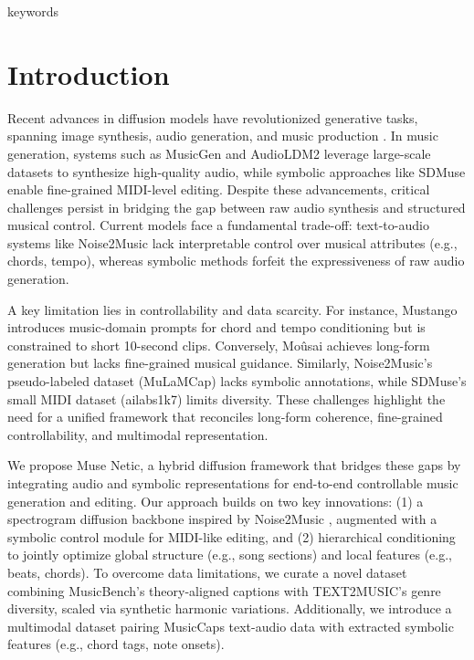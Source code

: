 \documentclass[conference]{IEEEtran}
\begin{document}
\begin{IEEEkeywords}
keywords
\end{IEEEkeywords}

\section{Introduction}
Recent advances in diffusion models have revolutionized generative tasks, spanning image synthesis, audio generation, and music production \cite{huang2024symbolicmusicgenerationnondifferentiable, mariani2024multisourcediffusionmodelssimultaneous}. In music generation, systems such as MusicGen \cite{copet2024simplecontrollablemusicgeneration} and AudioLDM2 \cite{liu2024audioldm2learningholistic} leverage large-scale datasets to synthesize high-quality audio, while symbolic approaches like SDMuse \cite{zhang2022sdmusestochasticdifferentialmusic} enable fine-grained MIDI-level editing. Despite these advancements, critical challenges persist in bridging the gap between raw audio synthesis and structured musical control. Current models face a fundamental trade-off: text-to-audio systems like Noise2Music \cite{huang2023noise2musictextconditionedmusicgeneration} lack interpretable control over musical attributes (e.g., chords, tempo), whereas symbolic methods forfeit the expressiveness of raw audio generation.  

A key limitation lies in controllability and data scarcity. For instance, Mustango \cite{melechovsky2024mustangocontrollabletexttomusicgeneration} introduces music-domain prompts for chord and tempo conditioning but is constrained to short 10-second clips. Conversely, Moûsai \cite{schneider2023mousaitexttomusicgenerationlongcontext} achieves long-form generation but lacks fine-grained musical guidance. Similarly, Noise2Music's pseudo-labeled dataset (MuLaMCap) lacks symbolic annotations, while SDMuse's small MIDI dataset (ailabs1k7) limits diversity. These challenges highlight the need for a unified framework that reconciles long-form coherence, fine-grained controllability, and multimodal representation.  

We propose Muse Netic, a hybrid diffusion framework that bridges these gaps by integrating audio and symbolic representations for end-to-end controllable music generation and editing. Our approach builds on two key innovations: (1) a spectrogram diffusion backbone inspired by Noise2Music \cite{huang2023noise2musictextconditionedmusicgeneration}, augmented with a symbolic control module for MIDI-like editing, and (2) hierarchical conditioning to jointly optimize global structure (e.g., song sections) and local features (e.g., beats, chords). To overcome data limitations, we curate a novel dataset combining MusicBench's theory-aligned captions with TEXT2MUSIC's genre diversity, scaled via synthetic harmonic variations. Additionally, we introduce a multimodal dataset pairing MusicCaps text-audio data with extracted symbolic features (e.g., chord tags, note onsets).  
\end{document}
